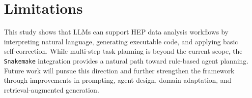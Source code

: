 \documentclass[aps,prd,reprint,superscriptaddress]{revtex4-2}
\begin{document}
\section{Limitations}
This study shows that LLMs can support HEP data analysis workflows by interpreting natural language, generating executable code, and applying basic self-correction. While multi-step task planning is beyond the current scope, the \texttt{Snakemake} integration provides a natural path toward rule-based agent planning. Future work will pursue this direction and further strengthen the framework through improvements in prompting, agent design, domain adaptation, and retrieval-augmented generation.

\end{document}
